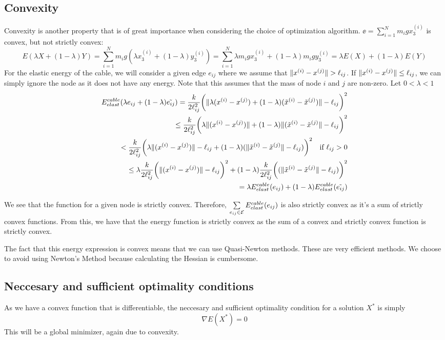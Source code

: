 \subsection{Convexity}

Convexity is another property that is of great importance when considering the choice of optimization algorithm.  $\ee =\sum_{i=1}^N m_i g x_3^{(i)}$ is convex, but not strictly convex:
\begin{equation*}
    E(\lambda X +(1-\lambda) Y) = \sum_{i=1}^N m_i g (\lambda x_3^{(i)} + (1-\lambda) y_3^{(i)})
    =\sum_{i=1}^N \lambda m_i g x_3^{(i)} + (1-\lambda) m_i g  y_3^{(i)} = \lambda E(X) + (1-\lambda) E(Y)
\end{equation*}
For the elastic energy of the cable, we will consider a given edge $e_{ij}$ where we assume that $\lVert x^{(i)} - x^{(j)}\rVert > \ell_{ij}$. If $\lVert x^{(i)} - x^{(j)}\rVert \leq \ell_{ij}$, we can simply ignore the node as it does not have any energy. Note that this assumes that the mass of node $i$ and $j$ are non-zero. Let $0 < \lambda < 1$
\begin{align*}
     E^{cable}_{elast}(\lambda e_{ij} + (1-\lambda) \tilde{e_{ij}}) = \frac{k}{2 \ell_{ij}^2} \bigg( \lVert \lambda(x^{(i)}-x^{(j)}) + ( 1-\lambda ) (\tilde{x}^{(i)}-\tilde{x}^{(j)} )\rVert -\ell_{ij}\bigg)^2\\ \leq \frac{k}{2 \ell_{ij}^2} \bigg( \lambda \lVert (x^{(i)}-x^{(j)}) \rVert +( 1-\lambda ) \lVert (\tilde{x}^{(i)}-\tilde{x}^{(j)} \rVert -\ell_{ij}\bigg)^2 \\ <
     \frac{k}{2 \ell_{ij}^2}\bigg( \lambda\lVert  (x^{(i)}-x^{(j)}) \rVert - \ell_{ij} +( 1-\lambda ) ( \lVert \tilde{x}^{(i)}-\tilde{x}^{(j)} \rVert -\ell_{ij} ) \bigg)^2 \quad \text{if $\ell_{ij} > 0$} \\
     \leq \lambda \frac{k}{2 \ell_{ij}^2}\bigg( \lVert  (x^{(i)}-x^{(j)}) \rVert - \ell_{ij} \bigg)^2 + ( 1-\lambda )\frac{k}{2 \ell_{ij}^2}\bigg( ( \lVert \tilde{x}^{(i)}-\tilde{x}^{(j)} \rVert -\ell_{ij} ) \bigg)^2 \\= \lambda E^{cable}_{elast}(e_{ij}) + (1-\lambda) E^{cable}_{elast}(\Tilde{e_{ij}})
\end{align*}

We see that the function for a given node is strictly convex. Therefore, $\sum\limits_{e_{ij} \in \mathcal{E}} E^{cable}_{elast}(e_{ij})$ is also strictly convex as it's a sum of strictly convex functions. From this, we have that the energy function is strictly convex as the sum of a convex and strictly convex function is strictly convex. 

The fact that this energy expression is convex means that we can use Quasi-Newton methods. These are very efficient methods. We choose to avoid using Newton's Method because calculating the Hessian is cumbersome.

\subsection{Neccesary and sufficient optimality conditions}
As we have a convex function that is differentiable, the neccesary and sufficient optimality condition for a solution $X^*$ is simply \begin{equation}
    \nabla E(X^*) = 0
\end{equation}
This will be a global minimizer, again due to convexity.